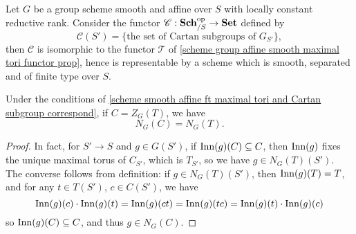\begin{corollary}\label{scheme smooth affine functor of Cartan subgroup representable if constant reductive rank}
Let $G$ be a group scheme smooth and affine over $S$ with locally constant reductive rank. Consider the functor $\mathscr{C}:\mathbf{Sch}_{/S}^{\mathrm{op}}\to\mathbf{Set}$ defined by
\[\mathscr{C}(S')=\{\text{the set of Cartan subgroups of $G_{S'}$}\},\]
then $\mathscr{C}$ is isomorphic to the functor $\mathscr{T}$ of \cref{scheme group affine smooth maximal tori functor prop}, hence is representable by a scheme which is smooth, separated and of finite type over $S$.
\end{corollary}

\begin{corollary}\label{scheme smooth affine ft normalizer of torus and Cartan equal}
Under the conditions of \cref{scheme smooth affine ft maximal tori and Cartan subgroup correspond}, if $C=Z_G(T)$, we have
\[N_G(C)=N_G(T).\]
\end{corollary}
\begin{proof}
In fact, for $S'\to S$ and $g\in G(S')$, if $\mathrm{Inn}(g)(C)\subseteq C$, then $\mathrm{Inn}(g)$ fixes the unique maximal torus of $C_{S'}$, which is $T_{S'}$, so we have $g\in N_G(T)(S')$. The converse follows from definition: if $g\in N_G(T)(S')$, then $\mathrm{Inn}(g)(T)=T$, and for any $t\in T(S')$, $c\in C(S')$, we have
\[\mathrm{Inn}(g)(c)\cdot\mathrm{Inn}(g)(t)=\mathrm{Inn}(g)(ct)=\mathrm{Inn}(g)(tc)=\mathrm{Inn}(g)(t)\cdot\mathrm{Inn}(g)(c)\]
so $\mathrm{Inn}(g)(C)\subseteq C$, and thus $g\in N_G(C)$.  
\end{proof}

